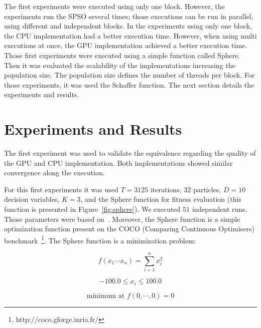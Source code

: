\documentclass[conference]{IEEEtran}
\begin{document}
    The first experiments were executed using only one block. However, the experiments run the SPSO several times; those executions can be run in parallel, using different and independent blocks. In the experiments using only one block, the CPU implementation had a better execution time. However, when using multi executions at once, the GPU implementation achieved a better execution time.
    Those first experiments were executed using a simple function called Sphere.
    Then it was evaluated the scalability of the implementations increasing the population size. The population size defines the number of threads per block. For those experiments, it was used the Schaffer function.
    The next section details the experiments and results.

    \section{Experiments and Results}

    The first experiment was used to validate the equivalence regarding the quality of the GPU and CPU implementation. Both implementations showed similar convergence along the execution.

    For this first experiments it was used $T=3125$ iterations, $32$ particles, $D=10$ decision variables, $K=3$, and the Sphere function for fitness evaluation (this function is presented in Figure~\ref{fig:sphere}).  We executed $51$ independent runs. Those parameters were based on~\cite{SPSOCEC}. Moreover, the Sphere function is a simple optimization function present on the COCO (Comparing Continuous Optimisers) benchmark~\footnote{http://coco.gforge.inria.fr/}. The Sphere function is a minimization problem: 

    \begin{equation}
        f(x_1 \cdots x_n) = \sum_{i=1}^n x_i^2
    \end{equation}

    \begin{equation}
            -100.0 \leq x_i \leq 100.0
    \end{equation}

    \begin{equation}
       \text{minimum at }f(0, \cdots, 0) = 0
    \end{equation}
\end{document}
